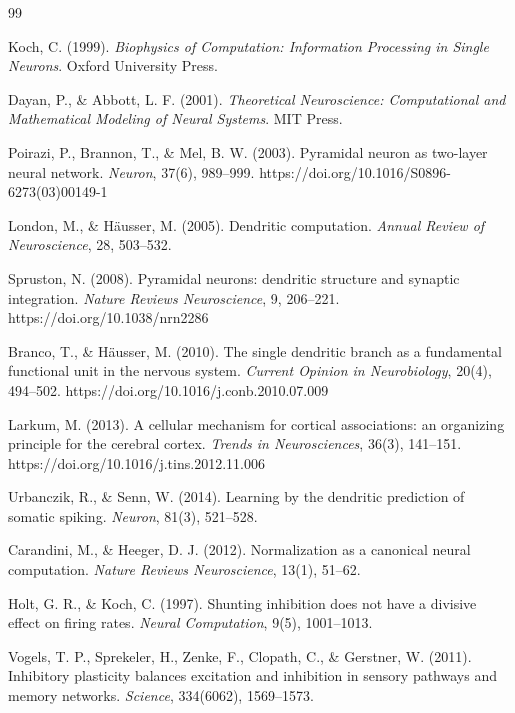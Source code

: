     \begin{thebibliography}{99}
    
    Koch, C. (1999).
    \emph{Biophysics of Computation: Information Processing in Single Neurons}.
    Oxford University Press.
    
    Dayan, P., \& Abbott, L. F. (2001).
    \emph{Theoretical Neuroscience: Computational and Mathematical Modeling of Neural Systems}.
    MIT Press.
    
    Poirazi, P., Brannon, T., \& Mel, B. W. (2003).
    Pyramidal neuron as two-layer neural network.
    \emph{Neuron}, 37(6), 989--999.
    https://doi.org/10.1016/S0896-6273(03)00149-1
    
    London, M., \& H{\"a}usser, M. (2005).
    Dendritic computation.
    \emph{Annual Review of Neuroscience}, 28, 503--532.
    
    Spruston, N. (2008).
    Pyramidal neurons: dendritic structure and synaptic integration.
    \emph{Nature Reviews Neuroscience}, 9, 206--221. https://doi.org/10.1038/nrn2286
    
    Branco, T., \& H{\"a}usser, M. (2010).
    The single dendritic branch as a fundamental functional unit in the nervous system.
    \emph{Current Opinion in Neurobiology}, 20(4), 494--502. https://doi.org/10.1016/j.conb.2010.07.009
    
    Larkum, M. (2013).
    A cellular mechanism for cortical associations: an organizing principle for the cerebral cortex.
    \emph{Trends in Neurosciences}, 36(3), 141--151. https://doi.org/10.1016/j.tins.2012.11.006
    
    Urbanczik, R., \& Senn, W. (2014).
    Learning by the dendritic prediction of somatic spiking.
    \emph{Neuron}, 81(3), 521--528.
    
    Carandini, M., \& Heeger, D. J. (2012).
    Normalization as a canonical neural computation.
    \emph{Nature Reviews Neuroscience}, 13(1), 51--62.
    
    Holt, G. R., \& Koch, C. (1997).
    Shunting inhibition does not have a divisive effect on firing rates.
    \emph{Neural Computation}, 9(5), 1001--1013.
    
    Vogels, T. P., Sprekeler, H., Zenke, F., Clopath, C., \& Gerstner, W. (2011).
    Inhibitory plasticity balances excitation and inhibition in sensory pathways and memory networks.
    \emph{Science}, 334(6062), 1569--1573.
    

\end{thebibliography}
